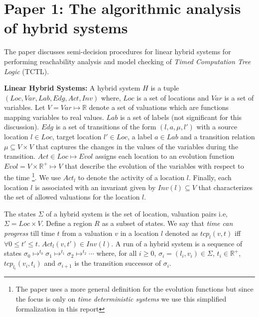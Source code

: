 \newcommand{\real}{\mathbb{R}}
\newcommand{\loc}{\mathit{Loc}}
\newcommand{\var}{\mathit{Var}}
\newcommand{\lab}{\mathit{Lab}}
\newcommand{\edg}{\mathit{Edg}}
\newcommand{\act}{\mathit{Act}}
\newcommand{\evol}{\mathit{Evol}}
\newcommand{\invr}{\mathit{Inv}}
\newcommand{\trans}{\mathit{(l,a,\mu,l')}}
\newcommand{\reach}{\mapsto^*}
\newcommand{\ftclosure}[2]{\langle #1 \rangle^{\nearrow}_{#2}}
\newcommand{\btclosure}[2]{\langle #1 \rangle^{\swarrow}_{#2}}
\newcommand{\lfp}{\mathit{lfp}}
\newcommand{\wide}{\nabla}
\newcommand{\pred}{\triangleright}

\section{Paper 1: The algorithmic analysis of hybrid systems \cite{Alur:95}} \label{sec:paper1}

The paper discusses semi-decision procedures for linear hybrid systems for performing reachability analysis and 
model checking of \emph{Timed Computation Tree Logic} (TCTL). 

\textbf{Linear Hybrid Systems:}
A hybrid system $H$ is a tuple $(\loc,\var,\lab,\edg,\act,\invr)$ where,
$\loc$ is a set of locations and $\var$ is a set of variables. 
Let $V= \var \mapsto \real$ denote a set of valuations which are functions mapping variables to real values.
$\lab$ is a set of labels (not significant for this discussion). $\edg$ is a set of transitions of the form $\trans$ with a source location $l \in \loc$, target location $l' \in \loc$, a label $a \in \lab$ and a transition relation $\mu \subseteq V \times V$ that captures the changes in the values of the variables during the transition. 
$\act \in \loc \mapsto \evol$ assigns each location to an evolution function $\evol = V \times \real^+ \mapsto V$ that describe the evolution of the variables with respect to the time
\footnote{The paper uses a more general definition for the evolution functions but since the focus is only on \emph{time deterministic systems} we use this simplified formalization in this report}. 
We use $\act_l$ to denote the activity of a location $l$.
Finally, each location $l$ is associated with an invariant given by $\invr(l) \subseteq V$ that characterizes the set of allowed valuations for the location $l$.

The states $\Sigma$ of a hybrid system is the set of location, valuation pairs i.e, $\Sigma = \loc \times V$.
Define a region $R$ as a subset of states.
We say that \emph{time can progress} till time $t$ from a valuation $v$ in a location $l$ denoted as 
$tcp_l(v,t)$ iff $\forall 0 \le t' \le t. \; \act_l(v,t') \in \invr(l)$.
A run of a hybrid system is a sequence of states $\sigma_0 \mapsto^{t_0} \sigma_1 \mapsto^{t_1} \sigma_2 \mapsto^{t_2} \cdots$ 
where, for all $i \ge 0$, $\sigma_i = (l_i,v_i) \in \Sigma$, $t_i \in \real^+$,
$tcp_{l_i}(v_i,t_i)$ and
$\sigma_{i+1}$ is the transition successor of $\sigma_i$.

